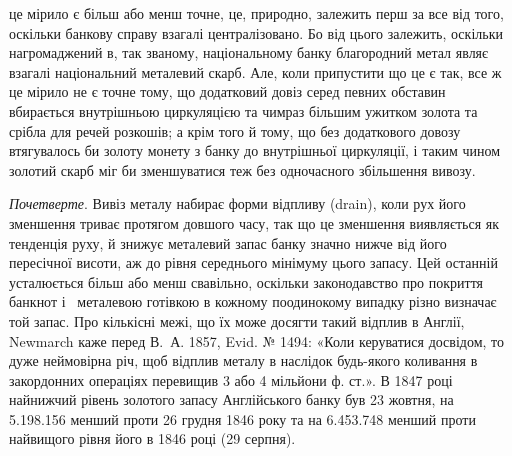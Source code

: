 \parcont{}  %
це мірило є більш або менш точне, це, природно, залежить перш за все від
того, оскільки банкову справу взагалі централізовано. Бо від цього залежить,
оскільки нагромаджений в, так званому, національному банку благородний метал
являє взагалі національний металевий скарб. Але, коли припустити що це є так,
все ж це мірило не є точне тому, що додатковий довіз серед певних обставин
вбирається внутрішньою циркуляцією та чимраз більшим ужитком золота та
срібла для речей розкошів; а крім того й тому, що без додаткового довозу
втягувалось би золоту монету з банку до внутрішньої циркуляції, і таким
чином золотий скарб міг би зменшуватися теж без одночасного збільшення вивозу.

\emph{Почетверте}. Вивіз металу набирає форми відпливу (drain), коли рух
його зменшення триває протягом довшого часу, так що це зменшення виявляється
як тенденція руху, й знижує металевий запас банку значно нижче від його пересічної
висоти, аж до рівня середнього мінімуму цього запасу. Цей останній усталюється
більш або менш свавільно, оскільки законодавство про покриття банкнот і~
металевою готівкою в кожному поодинокому випадку різно визначає той запас.
Про кількісні межі, що їх може досягти такий відплив в Англії, Newmarch
каже перед В.~А. 1857, Evid. № 1494: «Коли керуватися досвідом, то дуже
неймовірна річ, щоб відплив металу в наслідок будь-якого коливання в закордонних
операціях перевищив 3 або 4 мільйони ф. ст.». В 1847 році найнижчий
рівень золотого запасу Англійського банку був 23 жовтня, на \num{5.198.156}
менший проти 26 грудня 1846 року та на \num{6.453.748} менший проти найвищого
рівня його в 1846 році (29 серпня).


